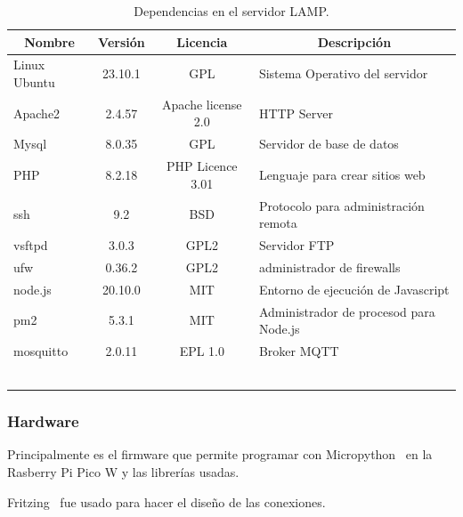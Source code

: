 \footnotesize%
\begin{longtable}[c]{@{}lccl@{}}
\toprule
\multicolumn{1}{c}{\textbf{Nombre}} & \textbf{Versión} & \textbf{Licencia} & \multicolumn{1}{c}{\textbf{Descripción}} \\ \midrule
\endfirsthead
%
\endhead
%
\bottomrule
\endfoot
%
\endlastfoot
%
Linux Ubuntu & 23.10.1  & GPL & Sistema Operativo del servidor \\
Apache2 & 2.4.57 & Apache license 2.0 &  HTTP Server\\
Mysql & 8.0.35 & GPL &  Servidor de base de datos\\
PHP & 8.2.18 & PHP Licence 3.01 &  Lenguaje para crear sitios web\\
ssh & 9.2 & BSD & Protocolo para administración remota\\
vsftpd & 3.0.3 & GPL2 & Servidor FTP\\
ufw & 0.36.2 &  GPL2 & administrador de firewalls\\
node.js & 20.10.0  & MIT &  Entorno de ejecución de Javascript\\
pm2 & 5.3.1 & MIT & Administrador de procesod para Node.js\\
mosquitto & 2.0.11 & EPL 1.0 & Broker MQTT \\
\bottomrule~\\
\caption{Dependencias en el servidor LAMP.}
\label{tab:BackEnd}
\end{longtable}
\normalsize

\subsubsection{Hardware}

Principalmente es el firmware que permite programar con Micropython~\cite{wiki:micropython} en la Rasberry Pi Pico W y las librerías usadas.

Fritzing~\cite{misc:Fritzing} fue usado para hacer el diseño de las conexiones.

